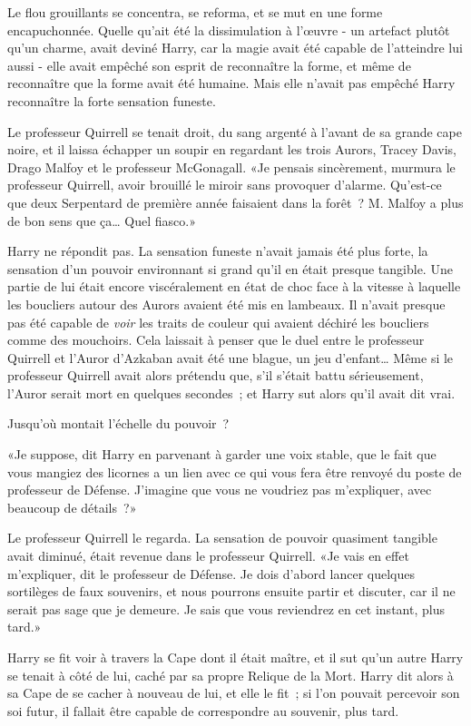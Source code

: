 Le flou grouillants se concentra, se reforma, et se mut en une forme encapuchonnée. Quelle qu'ait été la dissimulation à l'œuvre - un artefact plutôt qu'un charme, avait deviné Harry, car la magie avait été capable de l'atteindre lui aussi - elle avait empêché son esprit de reconnaître la forme, et même de reconnaître que la forme avait été humaine. Mais elle n'avait pas empêché Harry reconnaître la forte sensation funeste.

Le professeur Quirrell se tenait droit, du sang argenté à l'avant de sa grande cape noire, et il laissa échapper un soupir en regardant les trois Aurors, Tracey Davis, Drago Malfoy et le professeur McGonagall. «Je pensais sincèrement, murmura le professeur Quirrell, avoir brouillé le miroir sans provoquer d'alarme. Qu'est-ce que deux Serpentard de première année faisaient dans la forêt~? M. Malfoy a plus de bon sens que ça… Quel fiasco.»

Harry ne répondit pas. La sensation funeste n'avait jamais été plus forte, la sensation d'un pouvoir environnant si grand qu'il en était presque tangible. Une partie de lui était encore viscéralement en état de choc face à la vitesse à laquelle les boucliers autour des Aurors avaient été mis en lambeaux. Il n'avait presque pas été capable de \emph{voir} les traits de couleur qui avaient déchiré les boucliers comme des mouchoirs. Cela laissait à penser que le duel entre le professeur Quirrell et l'Auror d'Azkaban avait été une blague, un jeu d'enfant… Même si le professeur Quirrell avait alors prétendu que, s'il s'était battu sérieusement, l'Auror serait mort en quelques secondes~; et Harry sut alors qu'il avait dit vrai.

Jusqu'où montait l'échelle du pouvoir~?

«Je suppose, dit Harry en parvenant à garder une voix stable, que le fait que vous mangiez des licornes a un lien avec ce qui vous fera être renvoyé du poste de professeur de Défense. J'imagine que vous ne voudriez pas m'expliquer, avec beaucoup de détails~?»

Le professeur Quirrell le regarda. La sensation de pouvoir quasiment tangible avait diminué, était revenue dans le professeur Quirrell. «Je vais en effet m'expliquer, dit le professeur de Défense. Je dois d'abord lancer quelques sortilèges de faux souvenirs, et nous pourrons ensuite partir et discuter, car il ne serait pas sage que je demeure. Je sais que vous reviendrez en cet instant, plus tard.»

Harry se fit voir à travers la Cape dont il était maître, et il sut qu'un autre Harry se tenait à côté de lui, caché par sa propre Relique de la Mort. Harry dit alors à sa Cape de se cacher à nouveau de lui, et elle le fit~; si l'on pouvait percevoir son soi futur, il fallait être capable de correspondre au souvenir, plus tard.

